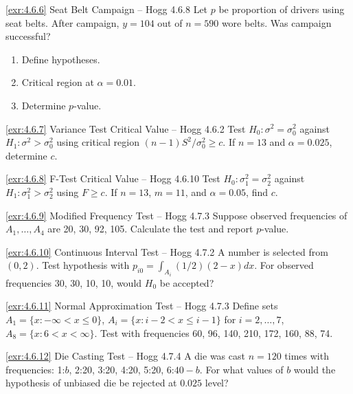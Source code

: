 \begin{exercise}{\ref{exr:4.6.6} Seat Belt Campaign – Hogg 4.6.8}\label{exr:4.6.6}
Let $p$ be proportion of drivers using seat belts. After campaign, $y=104$ out of $n=590$ wore belts. Was campaign successful?
\begin{enumerate}
\item[(a)] Define hypotheses.
\item[(b)] Critical region at $\alpha=0.01$.
\item[(c)] Determine $p$-value.
\end{enumerate}
\end{exercise}

\begin{exercise}{\ref{exr:4.6.7} Variance Test Critical Value – Hogg 4.6.2}\label{exr:4.6.7}
Test $H_0: \sigma^2 = \sigma_0^2$ against $H_1: \sigma^2 > \sigma_0^2$ using critical region $(n-1)S^2/\sigma_0^2 \geq c$. If $n=13$ and $\alpha=0.025$, determine $c$.
\end{exercise}

\begin{exercise}{\ref{exr:4.6.8} F-Test Critical Value – Hogg 4.6.10}\label{exr:4.6.8}
Test $H_0: \sigma_1^2 = \sigma_2^2$ against $H_1: \sigma_1^2 > \sigma_2^2$ using $F \geq c$. If $n=13$, $m=11$, and $\alpha=0.05$, find $c$.
\end{exercise}

\begin{exercise}{\ref{exr:4.6.9} Modified Frequency Test – Hogg 4.7.3}\label{exr:4.6.9}
Suppose observed frequencies of $A_1,\ldots,A_4$ are 20, 30, 92, 105. Calculate the test and report $p$-value.
\end{exercise}

\begin{exercise}{\ref{exr:4.6.10} Continuous Interval Test – Hogg 4.7.2}\label{exr:4.6.10}
A number is selected from $(0,2)$. Test hypothesis with $p_{i0} = \int_{A_i} (1/2)(2-x)dx$. For observed frequencies 30, 30, 10, 10, would $H_0$ be accepted?
\end{exercise}

\begin{exercise}{\ref{exr:4.6.11} Normal Approximation Test – Hogg 4.7.3}\label{exr:4.6.11}
Define sets $A_1=\{x:-\infty<x\leq 0\}$, $A_i=\{x:i-2<x\leq i-1\}$ for $i=2,\ldots,7$, $A_8=\{x:6<x<\infty\}$. Test with frequencies 60, 96, 140, 210, 172, 160, 88, 74.
\end{exercise}

\begin{exercise}{\ref{exr:4.6.12} Die Casting Test – Hogg 4.7.4}\label{exr:4.6.12}
A die was cast $n=120$ times with frequencies: 1:$b$, 2:20, 3:20, 4:20, 5:20, 6:$40-b$. For what values of $b$ would the hypothesis of unbiased die be rejected at $0.025$ level?
\end{exercise}

